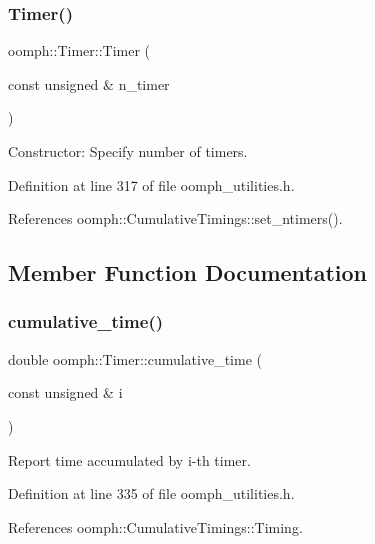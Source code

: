 \subsubsection{\texorpdfstring{Timer()}{Timer()}}
{\footnotesize\ttfamily oomph\+::\+Timer\+::\+Timer (\begin{DoxyParamCaption}\item[{const unsigned \&}]{n\+\_\+timer }\end{DoxyParamCaption})\hspace{0.3cm}{\ttfamily [inline]}}



Constructor\+: Specify number of timers. 



Definition at line 317 of file oomph\+\_\+utilities.\+h.



References oomph\+::\+Cumulative\+Timings\+::set\+\_\+ntimers().



\subsection{Member Function Documentation}
\mbox{\label{classoomph_1_1Timer_a77dfee0aa6e15ec95095f76a1f1b91c0}} 
\subsubsection{\texorpdfstring{cumulative\+\_\+time()}{cumulative\_time()}}
{\footnotesize\ttfamily double oomph\+::\+Timer\+::cumulative\+\_\+time (\begin{DoxyParamCaption}\item[{const unsigned \&}]{i }\end{DoxyParamCaption})\hspace{0.3cm}{\ttfamily [inline]}}



Report time accumulated by i-\/th timer. 



Definition at line 335 of file oomph\+\_\+utilities.\+h.



References oomph\+::\+Cumulative\+Timings\+::\+Timing.

\mbox{\label{classoomph_1_1Timer_afa34218cf8b9badba4f3c59ce004962b}} 
